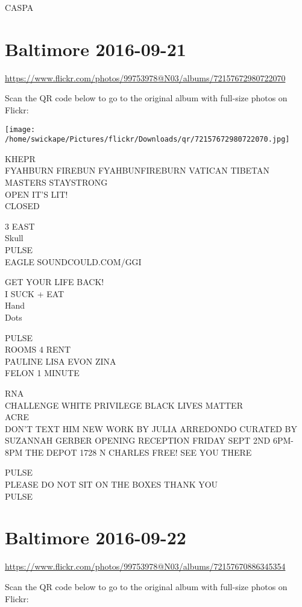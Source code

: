 \documentclass[10pt,letterpaper]{article}
\begin{document}
CASPA


\section*{Baltimore 2016-09-21}

\url{https://www.flickr.com/photos/99753978@N03/albums/72157672980722070}

Scan the QR code below to go to the original album with full-size photos on Flickr:

\texttt{[image: /home/swickape/Pictures/flickr/Downloads/qr/72157672980722070.jpg]}


KHEPR\\
FYAHBURN FIREBUN FYAHBUNFIREBURN VATICAN TIBETAN MASTERS STAYSTRONG\\
OPEN IT'S LIT!\\
CLOSED

3 EAST\\
Skull\\
PULSE\\
EAGLE SOUNDCOULD.COM/GGI

GET YOUR LIFE BACK!\\
I SUCK + EAT\\
Hand\\
Dots

PULSE\\
ROOMS 4 RENT\\
PAULINE LISA EVON ZINA\\
FELON 1 MINUTE

RNA\\
CHALLENGE WHITE PRIVILEGE BLACK LIVES MATTER\\
ACRE\\
DON'T TEXT HIM NEW WORK BY JULIA ARREDONDO CURATED BY SUZANNAH GERBER OPENING RECEPTION FRIDAY SEPT 2ND 6PM{-}8PM THE DEPOT 1728 N CHARLES FREE! SEE YOU THERE

PULSE\\
PLEASE DO NOT SIT ON THE BOXES THANK YOU\\
PULSE


\section*{Baltimore 2016-09-22}

\url{https://www.flickr.com/photos/99753978@N03/albums/72157670886345354}

Scan the QR code below to go to the original album with full-size photos on Flickr:
\end{document}
